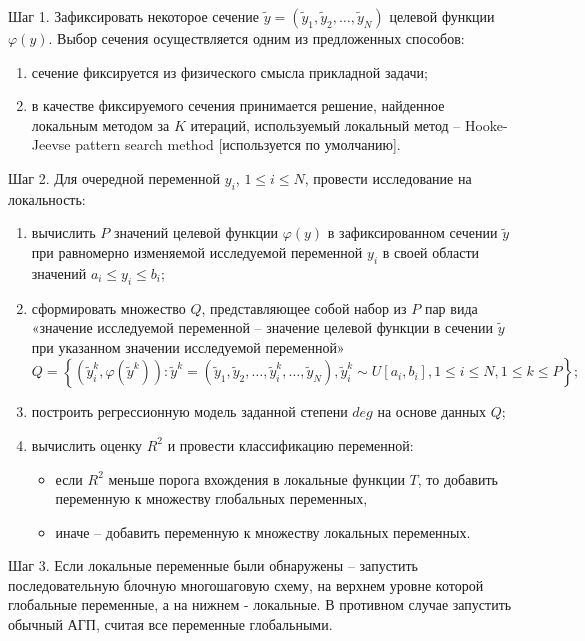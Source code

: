 \documentclass{aip-cp}
\begin{document}
Шаг 1. Зафиксировать некоторое сечение $\widetilde{y} = (\widetilde{y}_1, \widetilde{y}_2, … ,\widetilde{y}_N)$ целевой функции $\varphi(y)$. Выбор сечения осуществляется одним из предложенных способов:
\begin{enumerate}
\item сечение фиксируется из физического смысла прикладной задачи;
\item в качестве фиксируемого сечения принимается решение, найденное локальным методом за $K$ итераций, используемый локальный метод – Hooke-Jeevse pattern search method [используется по умолчанию].
\end{enumerate}

Шаг 2. Для очередной переменной $y_i$, $1\leq i \leq N$, провести исследование на локальность:
\begin{enumerate}
\item вычислить $P$ значений целевой функции $\varphi(y)$ в зафиксированном сечении $\widetilde{y}$ при равномерно изменяемой исследуемой переменной $y_i$ в своей области значений $a_i\leq y_i \leq b_i$;
\item сформировать множество $Q$, представляющее собой набор из $P$ пар вида «значение исследуемой переменной – значение целевой функции в сечении $\widetilde{y}$ при указанном значении исследуемой переменной»
\[
Q = \left\{ (\widetilde{y}^k_i,  \varphi({\widetilde{y}^k})): \widetilde{y}^k = (\widetilde{y}_1, \widetilde{y}_2, … , \widetilde{y}^k_i, … ,\widetilde{y}_N), \widetilde{y}^k_i \sim U[a_i, b_i], 1\leq i \leq N, 1\leq k \leq P \right\};
\]
\item построить регрессионную модель заданной степени $deg$ на основе данных $Q$;
\item вычислить оценку $R^2$ и провести классификацию переменной:
\begin{itemize}
\item если $R^2$ меньше порога вхождения в локальные функции $T$, то добавить переменную к множеству глобальных переменных,
\item иначе – добавить переменную к множеству локальных переменных.
\end{itemize}
\end{enumerate}

Шаг 3. Если локальные переменные были обнаружены – запустить последовательную блочную многошаговую схему, на верхнем уровне которой глобальные переменные, а на нижнем - локальные. В противном случае запустить обычный АГП, считая все переменные глобальными.
\end{document}
